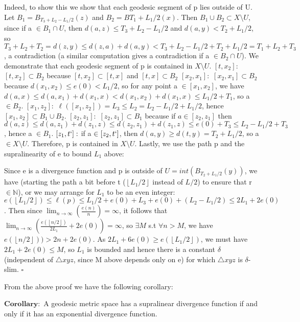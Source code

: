 \documentclass[11pt]{article}
\newcommand{\vs}{\vskip10pt}
\begin{document}
 	 Indeed, to show this we show that each geodesic segment of p lies outside of U. Let $B_1 = B_{
 	 T_3 + L_2 - L_1/2}(z)$ and $B_2 = B{T_1 + L_1/2}(x)$. Then $B_1 \cup B_2 \subset X \setminus U$, since if a $\in B_1 \cap U$, then $d(a, z) \leq T_3 + L_2 - L_1/2$ and $d(a, y) < T_2 + L_1/2$, so $T_3 + L_2 + T_2 = d(z, y) \leq d(z, a) + d(a,y) < T_3 + L_2 - L_1/2 + T_2 + L_1/2 = T_1 + L_2 + T_3$, a contradiction (a similar computation gives a contradiction if a $\in B_2 \cap U$). We demonstrate that each geodesic segment of p is contained in $X \setminus U$. 
  \vs
  	$[t, x_2]: $ $[t, x_2] \subset B_2$ because $[t, x_2] \subset [t,x]$ and $[t,x] \subset B_2$
  	\vskip5pt
  	$[x_2, x_1]: $ $[x_2, x_1] \subset B_2 $ because $d(x_1, x_2) \leq e(0) < L_1/2$, so for any point a $\in [x_1, x_2]$, we have $d(a, x) \leq d(a, x_1) + d(x_1, x) < d(x_1, x_2) + d(x_1, x) \leq L_1/2 + T_1$, so a $\in B_2$.
  	\vskip5pt
  	 $[x_1, z_2]: $ $\ell ([x_1, z_2]) = L_3 \leq L_2 = L_2 - L_1/2 + L_1/2$, hence $[x_1, z_2] \subset B_1 \cup B_2$. 
  	 \vskip5pt
  	 $[z_2, z_1]: $ $[z_2, z_1] \subset B_1$ because if $a \in [z_2, z_1]$ then $d(a, z) \leq d(a, z_1) + d(z_1, z) \leq d(z_2, z_1) + d(z_1, z) \leq e(0) + T_3 \leq L_2 - L_1/2 + T_3$, hence a $\in B_1$.
  	 \vskip5pt
  	 $[z_1, t`]: $ if a $\in [z_2, t`]$, then $d(a, y) \geq d(t, y) = T_2 + L_1/2$, so a $\in X \setminus U$.
  	 \vskip5pt
  	 Therefore, p is contained in $X \setminus U$. 
  	 \vs
  	 Lastly, we use the path p and the supralinearity of e to bound $L_1$ above: 
  	 \vs
  	 
  	 Since e is a divergence function and p is outside of $U = int(B_{T_2 + L_1/2}(y))$, we have (starting the path a bit before t ($\left \lfloor{L_1/2}\right \rfloor$ instead of $L/2$) to ensure that r $\in \mathbb{N}$), or we may arrange for $L_1$ to be an even integer: 
  	 \vs
  	 $e(\left \lfloor{L_1/2}\right \rfloor) \leq \ell(p) \leq L_1/2 + e(0) + L_3 + e(0) + (L_2 - L_1/2) \leq 2L_1 + 2e(0)$. 
  	 \vs
  	 Then since $\lim_{n \rightarrow \infty}(\frac{e(n)}{n}) = \infty $, it follows that $\lim_{n \rightarrow \infty}(\frac{e(\left \lfloor{n/2}\right \rfloor)}{2L_1} + 2e(0)) = \infty $, so $\exists M$ s.t $\forall n>M$, we have $e(\left \lfloor{n/2}\right \rfloor)) > 2n + 2e(0)$. As $2L_1 + 6e(0) \geq e(\left \lfloor{L_1/2}\right \rfloor)$, we must have $2L_1 + 2e(0) \leq M$, so $L_1$ is bounded and hence there is a constant $\delta$ (independent of $\triangle xyz$, since M above depends only on e) for which $\triangle xyz$ is $\delta$-slim. 
  	 $\square$
 	 
 	 \vs
 	 
 	 From the above proof we have the following corollary:
 	 \vs
 	 
 	 $\mathbf{Corollary: }$ A geodesic metric space has a supralinear divergence function if and only if it has an exponential divergence function. 
	
	
\end{document}
